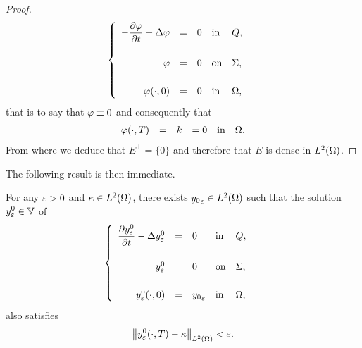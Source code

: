 \begin{proof}
\begin{equation*}
        \begin{cases}\displaystyle
            \begin{array}{rclll}
                -\dfrac{\partial{}\varphi}{\partial{}t} - \Delta\varphi & = & 0 & \text{in} &
                Q,\\
                \\
                \varphi & = & 0 & \text{on} & \Sigma,\\
                \\
                \varphi\!\left({\cdot,0}\right) & = & 0 & \text{in} &
                \Omega,
            \end{array}
        \end{cases}
    \end{equation*}
    that is to say that $\varphi\equiv 0$ and consequently that
    \begin{equation*}
        \begin{array}{rclcll}
            \varphi\!\left({\cdot,T}\right) & = & k & = 0 & \text{in} &
            \Omega.
        \end{array}
    \end{equation*}
    From where we deduce that $E^{\perp} = \{0\}$ and therefore that $E$ is
    dense in $L^{2}\!\left({\Omega}\right)$.
\end{proof}

The following result is then immediate.

\begin{corollaire}\label{coro:controllability-result-2}%
    For any $\varepsilon > 0$ and $\kappa\in L^{2}\!\left({\Omega}\right)$, there exists
    ${y_{0}}_{\varepsilon}\in L^{2}\!\left({\Omega}\right)$ such that the solution $\displaystyle
    y_{\varepsilon}^{0}\in \mathbb{V}$ of
    \begin{equation}\label{eq:controllability-result-3}
        \begin{cases}\displaystyle
            \begin{array}{rclll}
                \dfrac{\partial{}y_{\varepsilon}^{0}}{\partial{}t} - \Delta y_{\varepsilon}^{0} & = & 0 &
                \text{in} & Q,\\
                \\
                y_{\varepsilon}^{0} & = & 0 & \text{on} & \Sigma,\\
                \\
                y_{\varepsilon}^{0}\!\left({\cdot,0}\right) & = & {y_{0}}_{\varepsilon}
                & \text{in} & \Omega,
            \end{array}
        \end{cases}
    \end{equation}
    also satisfies
    \begin{equation*}\label{eq:controllability-result-4}
        {\left\|{y_{\varepsilon}^{0}\!\left({\cdot,T}\right) - \kappa }\right\|}_{L^{2}\left({\Omega}\right)} < \varepsilon.
    \end{equation*}
\end{corollaire}

